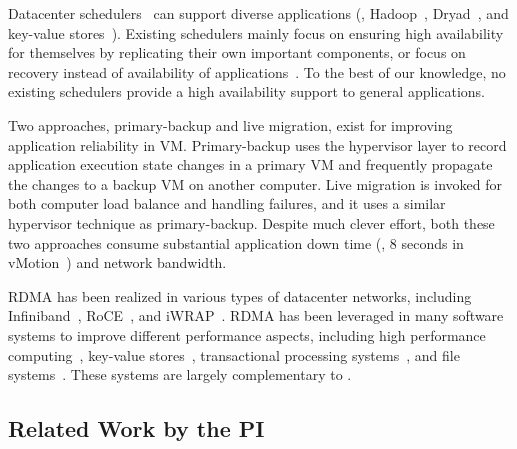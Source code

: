  Datacenter
schedulers~\cite{borg:eurosys15,mesos:nsdi11,tupperware,yarn:socc13,
autopilot:sosp07,quincy:sosp09,apollo:osdi14,fuxi:vldb14} can support diverse 
applications (\eg, Hadoop~\cite{hadoop}, Dryad~\cite{dryad}, and key-value 
stores~\cite{redis}). Existing schedulers mainly focus on ensuring high 
availability for themselves by replicating their own important components, or 
focus on recovery instead of availability of applications~\cite{fuxi:vldb14}. 
To the best of our knowledge, no existing schedulers provide a
high availability support to general applications.

 Two approaches, primary-backup and live 
migration, exist for improving application reliability in VM. Primary-backup 
uses the hypervisor layer to record application execution state changes in a 
primary VM and frequently propagate the changes to a backup VM on another 
computer. Live migration is invoked for both computer load balance and handling 
failures, and it uses a similar hypervisor technique as primary-backup. Despite 
much clever effort, both these two approaches consume substantial application 
down time (\eg, 8 seconds in vMotion~\cite{vmotion:atc05}) and network 
bandwidth.


 RDMA has been realized in various types of datacenter 
networks, including Infiniband~\cite{infiniband}, RoCE~\cite{roce}, and 
iWRAP~\cite{iwrap}. RDMA has been leveraged in many software systems to improve 
different performance aspects, including high performance 
computing~\cite{openmpi}, key-value 
stores~\cite{pilaf:usenix14,herd:sigcomm14,farm:nsdi14,memcached:rdma}, 
transactional processing systems~\cite{drtm:sosp15,farm:sosp15}, and file 
systems~\cite{gibson:nfs}. These systems are largely complementary to \xxx.

\vspace{-.15in}\subsection{Related Work by the PI} 
\label{sec:my-work}\vspace{-.075in}
% 

